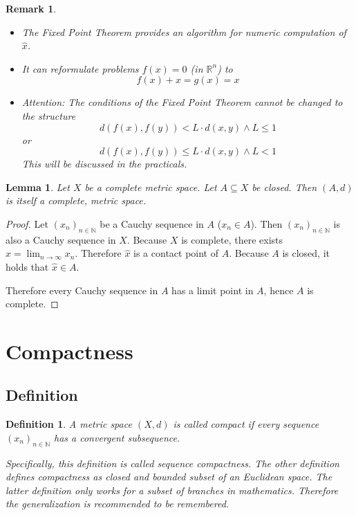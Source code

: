 \documentclass{article}
\newtheorem{definition}{Definition}  \numberwithin{definition}{section}
\newtheorem{lemma}{Lemma}  \numberwithin{lemma}{section}
\newtheorem{remark}{Remark}  \numberwithin{remark}{section}
\begin{document}
\begin{remark}
  \begin{itemize}
  	\item The Fixed Point Theorem provides an algorithm for numeric computation of $\hat{x}$.
    \item It can reformulate problems $f(x) = 0$ (in $\mathbb R^n$) to
      \[ f(x) + x = g(x) = x \]
    \item Attention: The conditions of the Fixed Point Theorem cannot be changed to the structure
      \[ d(f(x), f(y)) < L \cdot d(x, y) \land L \leq 1 \]
      or
      \[ d(f(x), f(y)) \leq L \cdot d(x, y) \land L < 1 \]
      This will be discussed in the practicals.
  \end{itemize}
\end{remark}

\begin{lemma} %
  \label{lemma7}
  Let $X$ be a complete metric space. Let $A \subseteq X$ be closed.
  Then $(A, d)$ is itself a complete, metric space.
\end{lemma}

\begin{proof}
  Let $(x_n)_{n \in \mathbb N}$ be a Cauchy sequence in $A$ ($x_n \in A$).
  Then $(x_n)_{n \in \mathbb N}$ is also a Cauchy sequence in $X$.
  Because $X$ is complete, there exists $\hat{x} = \lim_{n\to\infty} x_n$.
  Therefore $\hat{x}$ is a contact point of $A$.
  Because $A$ is closed, it holds that $\hat{x} \in A$.

  Therefore every Cauchy sequence in $A$ has a limit point in $A$,
  hence $A$ is complete.
\end{proof}

\section{Compactness}
\subsection{Definition}

\begin{definition} %
  A metric space $(X, d)$ is called \emph{compact} if every sequence $(x_n)_{n \in \mathbb N}$
  has a convergent subsequence.

  Specifically, this definition is called sequence compactness. The other definition defines compactness as closed and bounded subset of an Euclidean space. The latter definition only works for a subset of branches in mathematics. Therefore the generalization is recommended to be remembered.
\end{definition}
\end{document}
